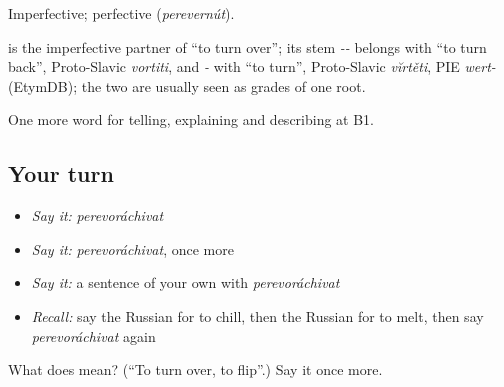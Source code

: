Imperfective; perfective \emph{} (\emph{perevernút}).

\begin{cousinweb}
\emph{} is the imperfective partner of \emph{} \textquotedblleft{}to turn over\textquotedblright{}; its stem \emph{--} belongs with \emph{} \textquotedblleft{}to turn back\textquotedblright{}, Proto-Slavic \emph{vortiti}, and \emph{-} with \emph{} \textquotedblleft{}to turn\textquotedblright{}, Proto-Slavic \emph{vĭrtěti}, PIE \emph{wert-} (EtymDB); the two are usually seen as grades of one root.
\end{cousinweb}

\begin{grammarlens}[title={What you've built}]
One more word for telling, explaining and describing at B1.
\end{grammarlens}

\subsection*{Your turn}
\begin{itemize}
\raggedright
  \item \emph{Say it:} \emph{perevoráchivat}
  \item \emph{Say it:} \emph{perevoráchivat}, once more
  \item \emph{Say it:} a sentence of your own with \emph{perevoráchivat}
  \item \emph{Recall:} say the Russian for to chill, then the Russian for to melt, then say \emph{perevoráchivat} again
\end{itemize}

\begin{tcolorbox}[breakable,colback=teal!4,colframe=teal!35!black,title={Before you move on}]
What does  mean? (\textquotedblleft{}To turn over, to flip\textquotedblright{}.) Say it once more.
\end{tcolorbox}
